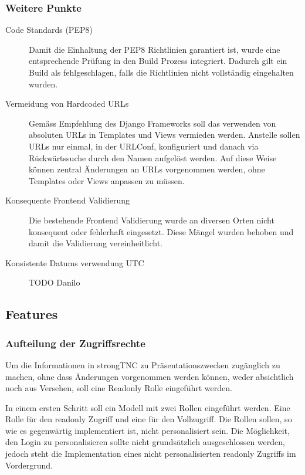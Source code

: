 \subsubsection{Weitere Punkte}
\begin{description}
\item[Code Standards (PEP8)] Damit die Einhaltung der PEP8 Richtlinien
garantiert ist, wurde eine entsprechende Prüfung in den Build Prozess
integriert. Dadurch gilt ein Build als fehlgeschlagen, falls die Richtlinien
nicht vollständig eingehalten wurden.

\item[Vermeidung von Hardcoded URLs] Gemäss Empfehlung des Django Frameworks
soll das verwenden von absoluten URLs in Templates und Views vermieden werden.
Anstelle sollen URLs nur einmal, in der URLConf, konfiguriert und danach via
Rückwärtssuche durch den Namen aufgelöst werden. Auf diese Weise können zentral
Änderungen an URLs vorgenommen werden, ohne Templates oder Views anpassen zu
müssen.

\item[Konsequente Frontend Validierung] Die bestehende Frontend Validierung
wurde an diversen Orten nicht konsequent oder fehlerhaft eingesetzt. Diese
Mängel wurden behoben und damit die Validierung vereinheitlicht.

\item[Konsistente Datums verwendung UTC]
TODO Danilo
\end{description}

\subsection{Features}

\subsubsection{Aufteilung der Zugriffsrechte}
Um die Informationen in strongTNC zu Präsentationszwecken zugänglich zu machen,
ohne dass Änderungen vorgenommen werden können, weder absichtlich noch aus
Versehen, soll eine Readonly Rolle eingeführt werden.

In einem ersten Schritt soll ein Modell mit zwei Rollen eingeführt werden. Eine
Rolle für den readonly Zugriff und eine für den Vollzugriff. Die Rollen sollen,
so wie es gegenwärtig implementiert ist, nicht personalisiert sein. Die
Möglichkeit, den Login zu personalisieren sollte nicht grundsätzlich
ausgeschlossen werden, jedoch steht die Implementation eines nicht
personalisierten readonly Zugriffs im Vordergrund.

